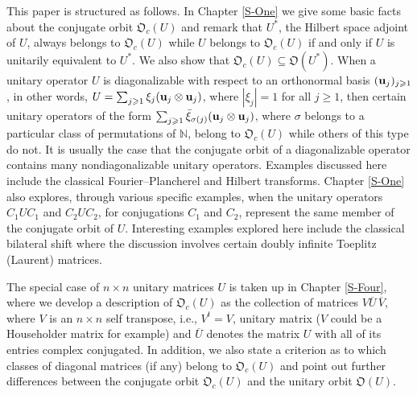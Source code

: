 \documentclass{dis}
\theoremstyle{plain}
\theoremstyle{definition}
\def\N{\mathbb{N}}
\renewcommand{\geq}{\geqslant}
\renewcommand{\subset}{\subseteq}
\renewcommand{\vec}[1]{{\bf #1}}
\newcommand{\0}{{\color{lightgray}0}}
\begin{document}
This paper is structured as follows. In Chapter \ref{S-One} we give some basic facts about the conjugate orbit $\mathfrak{O}_c(U)$ and remark that $U^{*} $, the Hilbert space adjoint of $U$,  always belongs to $\mathfrak{O}_c(U)$ while $U$ belongs to $\mathfrak{O}_c(U)$ if and only if $U$ is unitarily equivalent to $U^{*}$. We also show that $\mathfrak{O}_c(U) \subset \mathfrak{O}(U^{*})$. When a unitary operator $U$ is diagonalizable with respect to an orthonormal basis $(\vec{u}_j)_{j \geq 1}$, in other words,  $U = \sum_{j \geq 1} \xi_j (\vec{u}_j \otimes \vec{u}_j)$, where $|\xi_j| = 1$ for all $j \geq 1$, then certain  unitary operators  of the form $\sum_{j \geq 1} \bar \xi_{\sigma(j)}  (\vec{u}_j \otimes \vec{u}_j)$, where $\sigma$ belongs to a particular class of permutations of $\N$, belong to $\mathfrak{O}_c(U)$ while others of this type  do not. It is usually the case that the conjugate orbit  of a diagonalizable operator contains many nondiagonalizable unitary operators. Examples discussed here include the classical Fourier--Plancherel  and Hilbert transforms.
 Chapter \ref{S-One} also explores, through various specific examples, when the unitary operators $C_1 U C_1$ and $C_2 U C_2$, for conjugations $C_1$ and $C_2$, represent the same member of the conjugate orbit of $U$. Interesting examples explored here include the classical bilateral shift where the discussion involves certain doubly infinite Toeplitz (Laurent) matrices. 
 
 
 The special case of $n \times n$  unitary matrices $U$ is taken up in Chapter \ref{S-Four}, where we develop a description of $\mathfrak{O}_c(U)$ as the collection of matrices $V \overline{U} \,\overline{V}$, where $V$ is an $n \times n$  self transpose, i.e., $V^{t} = V$, unitary matrix ($V$ could be a Householder matrix for example) and $\overline{U}$ denotes the matrix $U$ with all of its entries complex conjugated. In addition, we also state a criterion as to which classes of diagonal matrices (if any) belong to $\mathfrak{O}_c(U)$ and point out further differences between the conjugate orbit $\mathfrak{O}_c(U)$ and the unitary orbit $\mathfrak{O}(U)$.
 
\end{document}
